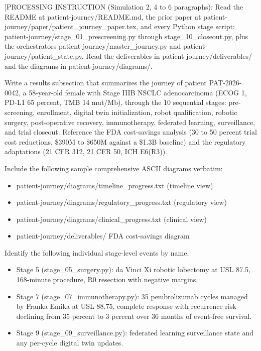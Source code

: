 [PROCESSING INSTRUCTION (Simulation 2, 4 to 6 paragraphs): Read the
README at patient-journey/README.md, the prior paper at
patient-journey/paper/patient\_journey\_paper.tex, and every Python stage
script: patient-journey/stage\_01\_prescreening.py through
stage\_10\_closeout.py, plus the orchestrators
patient-journey/master\_journey.py and patient-journey/patient\_state.py.
Read the deliverables in patient-journey/deliverables/ and the diagrams
in patient-journey/diagrams/.

Write a results subsection that summarizes the journey of patient
PAT-2026-0042, a 58-year-old female with Stage IIIB NSCLC adenocarcinoma
(ECOG 1, PD-L1 65 percent, TMB 14 mut/Mb), through the 10 sequential
stages: pre-screening, enrollment, digital twin initialization, robot
qualification, robotic surgery, post-operative recovery, immunotherapy,
federated learning, surveillance, and trial closeout. Reference the FDA
cost-savings analysis (30 to 50 percent trial cost reductions, \$390M to
\$650M against a \$1.3B baseline) and the regulatory adaptations (21 CFR
312, 21 CFR 50, ICH E6(R3)).

Include the following sample comprehensive ASCII diagrams verbatim:
\begin{itemize}[leftmargin=*]
\item patient-journey/diagrams/timeline\_progress.txt (timeline view)
\item patient-journey/diagrams/regulatory\_progress.txt (regulatory view)
\item patient-journey/diagrams/clinical\_progress.txt (clinical view)
\item patient-journey/deliverables/ FDA cost-savings diagram
\end{itemize}

Identify the following individual stage-level events by name:
\begin{itemize}[leftmargin=*]
\item Stage 5 (stage\_05\_surgery.py): da Vinci Xi robotic lobectomy at
USL 87.5, 168-minute procedure, R0 resection with negative margins.
\item Stage 7 (stage\_07\_immunotherapy.py): 35 pembrolizumab cycles
managed by Franka Emika at USL 88.75, complete response with recurrence
risk declining from 35 percent to 3 percent over 36 months of event-free
survival.
\item Stage 9 (stage\_09\_surveillance.py): federated learning surveillance
state and any per-cycle digital twin updates.
\end{itemize}

